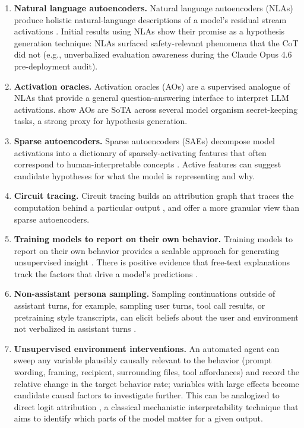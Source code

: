\documentclass{article}
\begin{document}
\begin{enumerate}
\item \textbf{Natural language autoencoders.} Natural language autoencoders (NLAs) produce holistic natural-language descriptions of a model's residual stream activations \citep{frasertaliente2026nla}. Initial results using NLAs show their promise as a hypothesis generation technique: NLAs surfaced safety-relevant phenomena that the CoT did not (e.g., unverbalized evaluation awareness during the Claude Opus 4.6 pre-deployment audit).

\item \textbf{Activation oracles.} Activation oracles (AOs) are a supervised analogue of NLAs that provide a general question-answering interface to interpret LLM activations. \citet{karvonen2025activationoracles} show AOs are SoTA across several model organism secret-keeping tasks, a strong proxy for hypothesis generation.

\item \textbf{Sparse autoencoders.} Sparse autoencoders (SAEs) decompose model activations into a dictionary of sparsely-activating features that often correspond to human-interpretable concepts \citep{bricken2023monosemanticity, templeton2024scaling}. Active features can suggest candidate hypotheses for what the model is representing and why.

\item \textbf{Circuit tracing.} Circuit tracing builds an attribution graph that traces the computation behind a particular output \citep{ameisen2025circuittracing, lindsey2025biology}, and offer a more granular view than sparse autoencoders.

\item \textbf{Training models to report on their own behavior.} Training models to report on their own behavior provides a scalable approach for generating unsupervised insight \citep{joglekar2025confessions}. There is positive evidence that free-text explanations track the factors that drive a model's predictions \citep{mayne2026faithfulness}.

\item \textbf{Non-assistant persona sampling.} Sampling continuations outside of assistant turns, for example, sampling user turns, tool call results, or pretraining style transcripts, can elicit beliefs about the user and environment not verbalized in assistant turns \citep{marks2026psm, marks2025auditing}.

\item \textbf{Unsupervised environment interventions.} An automated agent can sweep any variable plausibly causally relevant to the behavior (prompt wording, framing, recipient, surrounding files, tool affordances) and record the relative change in the target behavior rate; variables with large effects become candidate causal factors to investigate further. This can be analogized to direct logit attribution \citep{elhage2021framework}, a classical mechanistic interpretability technique that aims to identify which parts of the model matter for a given output.


\end{enumerate}
\end{document}
